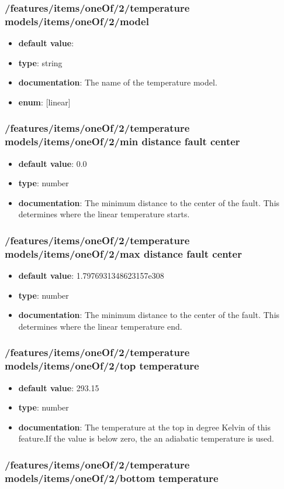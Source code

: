 \subsubsection{/features/items/oneOf/2/temperature models/items/oneOf/2/model}
\begin{itemize}\item {\bf default value}: 
\item {\bf type}: string
\item {\bf documentation}: The name of the temperature model.
\item {\bf enum}: [linear]\end{itemize}\subsubsection{/features/items/oneOf/2/temperature models/items/oneOf/2/min distance fault center}
\begin{itemize}\item {\bf default value}: 0.0
\item {\bf type}: number
\item {\bf documentation}: The minimum distance to the center of the fault. This determines where the linear temperature starts.
\end{itemize}\subsubsection{/features/items/oneOf/2/temperature models/items/oneOf/2/max distance fault center}
\begin{itemize}\item {\bf default value}: 1.7976931348623157e308
\item {\bf type}: number
\item {\bf documentation}: The minimum distance to the center of the fault. This determines where the linear temperature end.
\end{itemize}\subsubsection{/features/items/oneOf/2/temperature models/items/oneOf/2/top temperature}
\begin{itemize}\item {\bf default value}: 293.15
\item {\bf type}: number
\item {\bf documentation}: The temperature at the top in degree Kelvin of this feature.If the value is below zero, the an adiabatic temperature is used.
\end{itemize}\subsubsection{/features/items/oneOf/2/temperature models/items/oneOf/2/bottom temperature}
